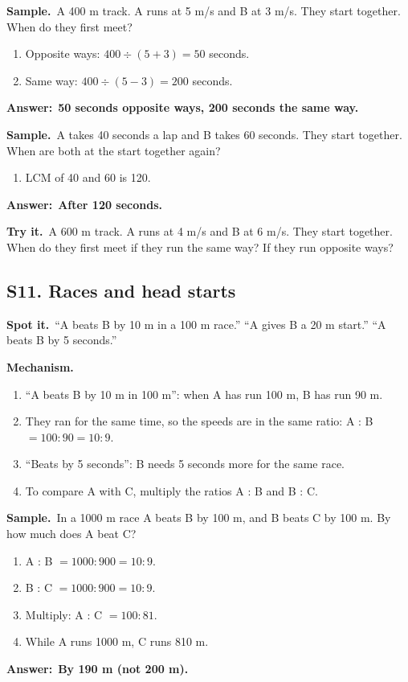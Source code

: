 \documentclass[11pt,a4paper]{article}
\let\oldsubsection\subsection
\renewcommand{\subsection}{\needspace{9\baselineskip}\oldsubsection}
\newcommand{\spot}{\textbf{\color{ember}Spot it.}\ }
\newcommand{\mech}{\textbf{\color{ember}Mechanism.}\ }
\newif\ifkeepsamp
\newcommand{\ans}[1]{\par\nopagebreak\noindent\textbf{\color{ember}Answer:}\ \textbf{#1}\par}
\newcommand{\samp}{\ifkeepsamp\needspace{4\baselineskip}\fi\textbf{\color{ember}Sample.}\ }
\newcommand{\tryit}[1]{\textbf{\color{ember}Try it.}\ #1}
\begin{document}
\samp A 400 m track. A runs at 5 m/s and B at 3 m/s. They start together. When do they first meet?
\begin{enumerate}
\item Opposite ways: $400 \div (5 + 3) = 50$ seconds.
\item Same way: $400 \div (5 - 3) = 200$ seconds.
\end{enumerate}
\ans{50 seconds opposite ways, 200 seconds the same way.}

\samp A takes 40 seconds a lap and B takes 60 seconds. They start together. When are both at the start together again?
\begin{enumerate}
\item LCM of 40 and 60 is 120.
\end{enumerate}
\ans{After 120 seconds.}

\tryit A 600 m track. A runs at 4 m/s and B at 6 m/s. They start together. When do they first meet if they run the same way? If they run opposite ways?

\subsection{S11. Races and head starts}
\spot ``A beats B by 10 m in a 100 m race.'' ``A gives B a 20 m start.'' ``A beats B by 5 seconds.''

\mech
\begin{enumerate}
\item ``A beats B by 10 m in 100 m'': when A has run 100 m, B has run 90 m.
\item They ran for the same time, so the speeds are in the same ratio: A : B $= 100 : 90 = 10 : 9$.
\item ``Beats by 5 seconds'': B needs 5 seconds more for the same race.
\item To compare A with C, multiply the ratios A : B and B : C.
\end{enumerate}

\samp In a 1000 m race A beats B by 100 m, and B beats C by 100 m. By how much does A beat C?
\begin{enumerate}
\item A : B $= 1000 : 900 = 10 : 9$.
\item B : C $= 1000 : 900 = 10 : 9$.
\item Multiply: A : C $= 100 : 81$.
\item While A runs 1000 m, C runs 810 m.
\end{enumerate}
\ans{By 190 m (not 200 m).}
\end{document}
